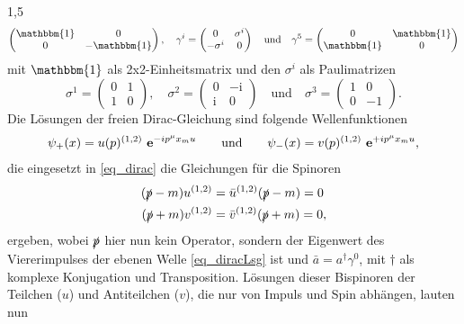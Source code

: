 \documentclass[11pt,a4paper,twoside]{report}
\begin{document}
\begin{spacing}{1,5}
\begin{equation*}
\begin{pmatrix}
              \mathbbm{1} & 0 \\
              0 & -\mathbbm{1}
             \end{pmatrix},\quad \gamma^i = \begin{pmatrix}
					0 & \sigma^i\\
					-\sigma^i & 0
				      \end{pmatrix} \quad \text{und}\quad \gamma^5 = \begin{pmatrix}
									  0 & \mathbbm{1}\\
									  \mathbbm{1} & 0
									   \end{pmatrix}
\end{equation*}
mit $\mathbbm{1}$ als 2x2-Einheitsmatrix und den $\sigma^i$ als Paulimatrizen
\begin{equation*}
 \sigma^1 = \begin{pmatrix}
             0 & 1\\
             1 & 0
            \end{pmatrix},\quad \sigma^2 = \begin{pmatrix}
					    0 & -\text{i}\\
					    \text{i} & 0
					    \end{pmatrix}\quad \text{und} \quad\sigma^3 = \begin{pmatrix}
									    1 & 0\\
									    0 & -1
									    \end{pmatrix}.									    
\end{equation*}
Die Lösungen der freien Dirac-Gleichung sind folgende Wellenfunktionen
\begin{align}
 \psi_+(x) = u(p)^{(1,2)} \ \mathbf{e}^{-ip^\mu x_mu}\qquad\text{und}\qquad \psi_-(x) = v(p)^{(1,2)} \ \mathbf{e}^{+ip^\mu x_mu},
 \label{eq_diracLsg}
\end{align}
die eingesetzt in \eqref{eq_dirac} die Gleichungen für die Spinoren
\begin{align}
 (\slashed{p} - m )u^{(1,2)} &= \bar u^{(1,2)}(\slashed{p}-m) = 0 \\
 (\slashed{p} + m )v^{(1,2)} &= \bar v^{(1,2)}(\slashed{p}+m) = 0,
\end{align}
ergeben, wobei $\slashed{p}$ hier nun kein Operator, sondern der Eigenwert des Viererimpulses der ebenen Welle \eqref{eq_diracLsg} ist und $\bar a = a^\dagger \gamma^0$,
mit $\dagger$ als komplexe Konjugation und Transposition. Lösungen dieser Bispinoren der Teilchen ($u$) und Antiteilchen ($v$), die nur von Impuls und Spin abhängen,
lauten nun
\begin{equation}

\end{equation}
\end{spacing}
\end{document}
